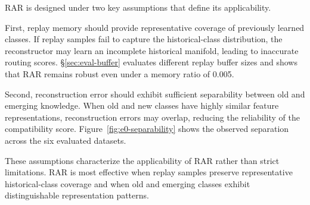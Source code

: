 RAR is designed under two key assumptions that define its applicability.

First, replay memory should provide representative coverage of previously learned classes. If replay samples fail to capture the historical-class distribution, the reconstructor may learn an incomplete historical manifold, leading to inaccurate routing scores. \S\ref{sec:eval-buffer} evaluates different replay buffer sizes and shows that RAR remains robust even under a memory ratio of 0.005.

Second, reconstruction error should exhibit sufficient separability between old and emerging knowledge. When old and new classes have highly similar feature representations, reconstruction errors may overlap, reducing the reliability of the compatibility score. Figure~\ref{fig:e0-separability} shows the observed separation across the six evaluated datasets.

These assumptions characterize the applicability of RAR rather than strict limitations. RAR is most effective when replay samples preserve representative historical-class coverage and when old and emerging classes exhibit distinguishable representation patterns.
